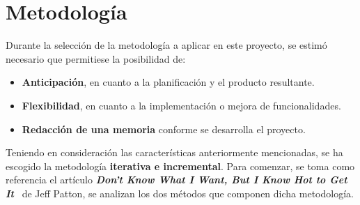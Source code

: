 \section{Metodología}
Durante la selección de la metodología a aplicar en este proyecto, se estimó necesario que permitiese la posibilidad de:

\begin{itemize}
    \item \textbf{Anticipación}, en cuanto a la planificación y el producto resultante.
    \item \textbf{Flexibilidad}, en cuanto a la implementación o mejora de funcionalidades.
    \item \textbf{Redacción de una memoria} conforme se desarrolla el proyecto.
\end{itemize}

Teniendo en consideración las características anteriormente mencionadas, se ha escogido la metodología \textbf{iterativa e incremental}. Para comenzar, se toma como referencia el artículo \textbf{\emph{Don't Know What I Want, But I Know Hot to Get It}}~\cite{monalisajp} de Jeff Patton, se analizan los dos métodos que componen dicha metodología.

